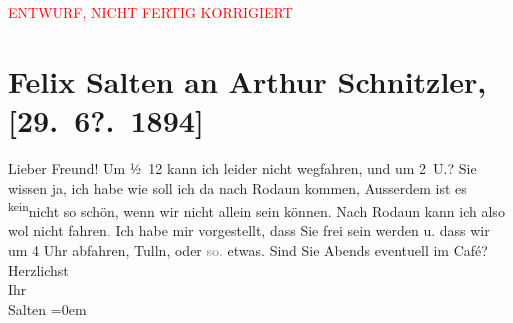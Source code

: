 
\begin{center}
            \textcolor{red}{ENTWURF, NICHT FERTIG KORRIGIERT}
                      \end{center}
            
         \renewcommand{\erwaehnteOrte}{Orte: Rodaun, Tulln an der Donau, Wien}
         \renewcommand{\erwaehnteWerke}{}
               \section[Felix Salten an Arthur Schnitzler, {[}29. 6?. 1894{]}]{ Felix Salten an Arthur Schnitzler, {[}29. 6?. 1894{]}}\nopagebreak{}\rehead{ }\begin{ledgroupsized}[t]{13cm}\normalsize\beginnumbering \toendnotes[C]{\smallbreak\pagebreak[2]} 
\toendnotes[C]{\smallbreak}\pstart
           \noindent{}{\pb}Lieber Freund! Um ½ 12 kann ich leider nicht wegfahren, und um
               2 U.? Sie wissen ja, ich habe \label{K_L03139-1v}\label{K_L03139-1h} wie soll ich
               da nach Rodaun kommen, Ausserdem {\pb}ist es \substVorne{}\textsuperscript{kein}\substDazwischen{}nic\substHinten{}ht so schön, wenn wir nicht allein sein können. \pend
           \pstart
           Nach Rodaun kann ich also wol nicht
                  fahren\textcolor{gray}{.} Ich habe mir vorgestellt, dass Sie frei sein werden u.
               dass wir um 4 Uhr abfahren, Tulln, oder
                  \textcolor{gray}{so.} etwas. Sind Sie {\pb}Abends eventuell im Café? \pend
           \pstart
           Herzlichst {\\[\baselineskip]}Ihr {\\[\baselineskip]}\spacefill\mbox{Salten}\pend
           \leftskip=0em{}
         
         \endnumbering{}\end{ledgroupsized}\begin{anhang}\end{anhang}\newcommand{\dateiname}{L03139}\newcommand{\titel}{Felix Salten an Arthur Schnitzler, [29. 6?. 1894]}\newcommand{\editorInnen}{Martin Anton Müller und Laura Untner}
      